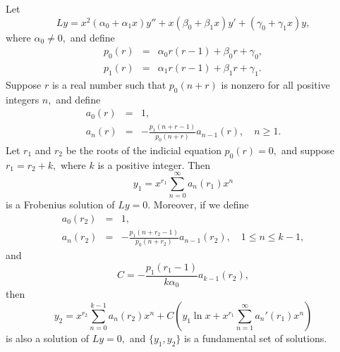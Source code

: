 \documentclass{ximera}
\begin{document}
\begin{theorem}\label{thmtype:7.7.1}
Let
$$
Ly=
x^2(\alpha_0+\alpha_1x)y''+x(\beta_0+\beta_1x)y'
+(\gamma_0+\gamma_1x)y,
$$
where $\alpha_0\neq0,$ and  define
\begin{eqnarray*}
p_0(r)&=&\alpha_0r(r-1)+\beta_0r+\gamma_0,\\
p_1(r)&=&\alpha_1r(r-1)+\beta_1r+\gamma_1.
\end{eqnarray*}
Suppose   $r$ is a real number such that $p_0(n+r)$ is nonzero
for all positive integers $n,$ and  define
\begin{equation} \label{eq:7.7.2}
\begin{array}{rcl}
a_0(r)&=&1,\\
a_n(r)&=&-\frac{p_1(n+r-1)}{p_0(n+r)}a_{n-1}(r),\quad n\geq 1.
\end{array}
\end{equation}
Let $r_1$ and $r_2$ be the roots of the indicial equation
$p_0(r)=0,$ and suppose $r_1=r_2+k,$ where $k$ is a positive
integer$.$ Then
$$
y_1=x^{r_1}\sum_{n=0}^\infty  a_n(r_1)x^n
$$
is a Frobenius solution of $Ly=0$.
Moreover, if we define
\begin{equation} \label{eq:7.7.3}
\begin{array}{rcl}
a_0(r_2)&=&1,\\
a_n(r_2)&=&-\frac{p_1(n+r_2-1)}{p_0(n+r_2)}a_{n-1}(r_2),\quad
1\leq n\leq k-1,
\end{array}
\end{equation}
and
\begin{equation} \label{eq:7.7.4}
C=-\frac{p_1(r_1-1)}{k\alpha_0}a_{k-1}(r_2),
\end{equation}
then
\begin{equation} \label{eq:7.7.5}
y_2=x^{r_2}\sum_{n=0}^{k-1}a_n(r_2)x^n+C\left(y_1\ln
x+x^{r_1}\sum_{n=1}^\infty a_n'(r_1)x^n\right)
\end{equation}
is also a   solution of $Ly=0,$ and $\{y_1,y_2\}$
is a fundamental set of  solutions.
\end{theorem}
\end{document}
